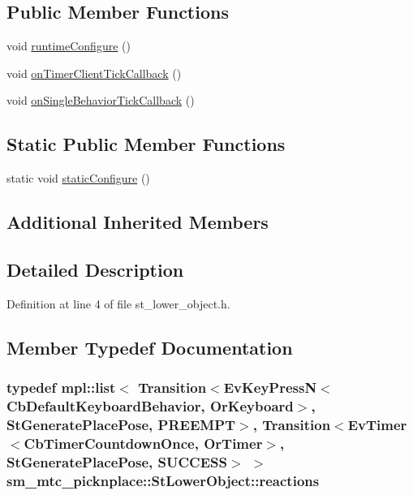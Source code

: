 \subsection*{Public Member Functions}
\begin{DoxyCompactItemize}
\item 
void \hyperlink{structsm__mtc__picknplace_1_1StLowerObject_a3564b5a351c681099f4ab3b5dd57d684}{runtime\+Configure} ()
\item 
void \hyperlink{structsm__mtc__picknplace_1_1StLowerObject_a3acad26ffd04856952d9f8d2095b4b41}{on\+Timer\+Client\+Tick\+Callback} ()
\item 
void \hyperlink{structsm__mtc__picknplace_1_1StLowerObject_afe0b5cce40b1d6d0359a1bd78f350c41}{on\+Single\+Behavior\+Tick\+Callback} ()
\end{DoxyCompactItemize}
\subsection*{Static Public Member Functions}
\begin{DoxyCompactItemize}
\item 
static void \hyperlink{structsm__mtc__picknplace_1_1StLowerObject_ac75a4099780bd73603a0c8038cf6096b}{static\+Configure} ()
\end{DoxyCompactItemize}
\subsection*{Additional Inherited Members}


\subsection{Detailed Description}


Definition at line 4 of file st\+\_\+lower\+\_\+object.\+h.



\subsection{Member Typedef Documentation}
\subsubsection[{\texorpdfstring{reactions}{reactions}}]{\setlength{\rightskip}{0pt plus 5cm}typedef mpl\+::list$<$ Transition$<$Ev\+Key\+PressN$<$Cb\+Default\+Keyboard\+Behavior, {\bf Or\+Keyboard}$>$, {\bf St\+Generate\+Place\+Pose}, {\bf P\+R\+E\+E\+M\+PT}$>$, Transition$<$Ev\+Timer$<$Cb\+Timer\+Countdown\+Once, {\bf Or\+Timer}$>$, {\bf St\+Generate\+Place\+Pose}, {\bf S\+U\+C\+C\+E\+SS}$>$ $>$ {\bf sm\+\_\+mtc\+\_\+picknplace\+::\+St\+Lower\+Object\+::reactions}}\hypertarget{structsm__mtc__picknplace_1_1StLowerObject_a158ee42367d7deba1d15ff719eb3d0d2}{}\label{structsm__mtc__picknplace_1_1StLowerObject_a158ee42367d7deba1d15ff719eb3d0d2}



